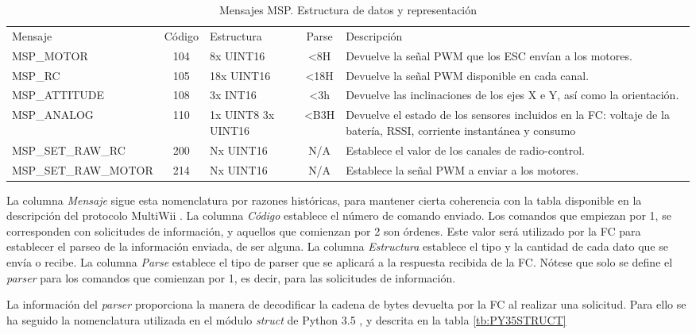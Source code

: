 \begin{landscape}
\begin{table}[H]
	\begin{center}	
		\begin{tabular}{m{5cm}  c  m{4cm}  c  m{7cm}}\hline
			\toprule
			Mensaje & Código & Estructura & Parse & Descripción\\
			\otoprule
			MSP\_MOTOR & 104 & 8x UINT16 & <8H & Devuelve la señal PWM que los ESC envían a los motores.\\
			MSP\_RC & 105 & 18x UINT16 & <18H & Devuelve la señal PWM disponible en cada canal.\\
			MSP\_ATTITUDE & 108  & 3x INT16 & <3h & Devuelve las inclinaciones de los ejes X e Y, así como la orientación.\\
			MSP\_ANALOG & 110 & 1x UINT8 3x UINT16 & <B3H & Devuelve el estado de los sensores incluidos en la FC: voltaje de la batería, RSSI, corriente instantánea y consumo\\
			MSP\_SET\_RAW\_RC & 200 & Nx UINT16 & N/A & Establece el valor de los canales de radio-control.\\
			MSP\_SET\_RAW\_MOTOR & 214 & Nx UINT16 & N/A & Establece la señal PWM a enviar a los motores.\\
			\bottomrule
		\end{tabular}
		\caption{Mensajes MSP. Estructura de datos y representación}
		\label{tb:MSP_MESSAGES}
	\end{center}
\end{table} 
La columna \textit{Mensaje} sigue esta nomenclatura por razones históricas, para mantener cierta coherencia con la tabla disponible en la descripción del protocolo MultiWii \citep{wiki:MSPDefinition}. La columna \textit{Código} establece el número de comando enviado. Los comandos que empiezan por 1, se corresponden con solicitudes de información, y aquellos que comienzan por 2 son órdenes. Este valor será utilizado por la FC para establecer el parseo de la información enviada, de ser alguna. La columna \textit{Estructura} establece el tipo y la cantidad de cada dato que se envía o recibe. La columna \textit{Parse} establece el tipo de parser que se aplicará a la respuesta recibida de la FC. Nótese que solo se define el \emph{parser} para los comandos que comienzan por 1, es decir, para las solicitudes de información.
\end{landscape}




La información del \emph{parser} proporciona la manera de decodificar la cadena de bytes devuelta por la FC al realizar una solicitud. Para ello se ha seguido la nomenclatura utilizada en el módulo \textit{struct} de Python 3.5 \citep{wiki:PythonStruct}, y  descrita en la tabla \ref{tb:PY35STRUCT}

